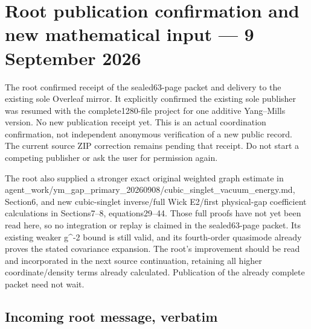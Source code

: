 \section{Root publication confirmation and new mathematical input --- 9
September
2026}\label{root-publication-and-graph-intake-20260909-md-root-publication-confirmation-and-new-mathematical-input-9-september-2026}

The root confirmed receipt of the sealed63-page packet and delivery to
the existing sole Overleaf mirror. It explicitly confirmed the existing
sole publisher was resumed with the complete1280-file project for one
additive Yang--Mills version. No new publication receipt yet. This is an
actual coordination confirmation, not independent anonymous verification
of a new public record. The current source ZIP correction remains
pending that receipt. Do not start a competing publisher or ask the user
for permission again.

The root also supplied a stronger exact original weighted graph estimate
in
agent\_work/ym\_gap\_primary\_20260908/cubic\_singlet\_vacuum\_energy.md,
Section6, and new cubic-singlet inverse/full Wick E2/first physical-gap
coefficient calculations in Sections7--8, equations29--44. Those full
proofs have not yet been read here, so no integration or replay is
claimed in the sealed63-page packet. Its existing weaker g\^{}-2 bound
is still valid, and its fourth-order quasimode already proves the stated
covariance expansion. The root's improvement should be read and
incorporated in the next source continuation, retaining all higher
coordinate/density terms already calculated. Publication of the already
complete packet need not wait.

\subsection{Incoming root message,
verbatim}\label{root-publication-and-graph-intake-20260909-md-incoming-root-message-verbatim}

